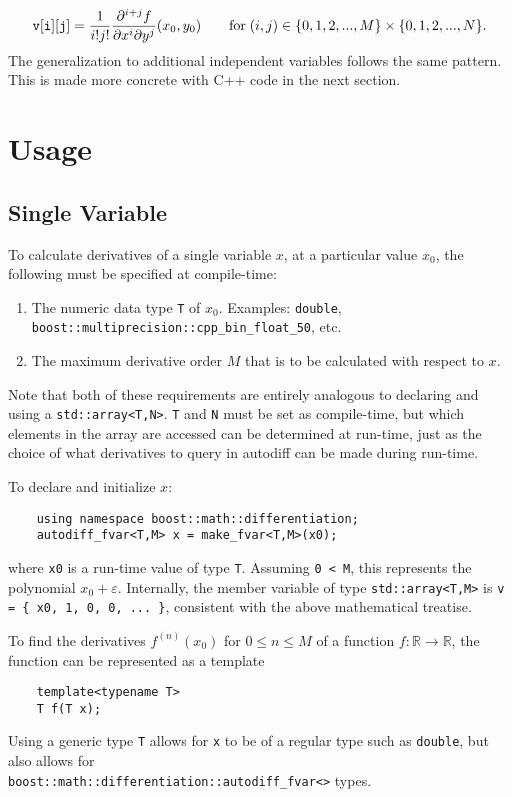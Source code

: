 \documentclass{article}
\begin{document}
\[
{\tt v[i][j]} = \frac{1}{i!j!}\frac{\partial^{i+j}f}{\partial x^i\partial y^j}(x_0,y_0)
    \qquad \text{for}\; (i,j)\in\{0,1,2,...,M\}\times\{0,1,2,...,N\}.
\]
The generalization to additional independent variables follows the same pattern. This is made more concrete with
C++ code in the next section.

\section{Usage}

\subsection{Single Variable}

To calculate derivatives of a single variable $x$, at a particular value $x_0$, the following must be
specified at compile-time:

\begin{enumerate}
\item The numeric data type {\tt T} of $x_0$. Examples: {\tt double},
    {\tt boost::multiprecision::cpp\_bin\_float\_50}, etc.
\item The maximum derivative order $M$ that is to be calculated with respect to $x$.
\end{enumerate}
Note that both of these requirements are entirely analogous to declaring and using a {\tt std::array<T,N>}. {\tt T}
and {\tt N} must be set as compile-time, but which elements in the array are accessed can be determined at run-time,
just as the choice of what derivatives to query in autodiff can be made during run-time.

To declare and initialize $x$:

\begin{verbatim}
    using namespace boost::math::differentiation;
    autodiff_fvar<T,M> x = make_fvar<T,M>(x0);
\end{verbatim}
where {\tt x0} is a run-time value of type {\tt T}. Assuming {\tt 0 < M}, this represents the polynomial $x_0 +
\varepsilon$. Internally, the member variable of type {\tt std::array<T,M>} is {\tt v = \{ x0, 1, 0, 0, ... \}},
consistent with the above mathematical treatise.

To find the derivatives $f^{(n)}(x_0)$ for $0\le n\le M$ of a function
$f : \mathbb{R}\rightarrow\mathbb{R}$, the function can be represented as a template

\begin{verbatim}
    template<typename T>
    T f(T x);
\end{verbatim}
Using a generic type {\tt T} allows for {\tt x} to be of a regular type such as {\tt double}, but also allows for\\
{\tt boost::math::differentiation::autodiff\_fvar<>} types.
\end{document}

